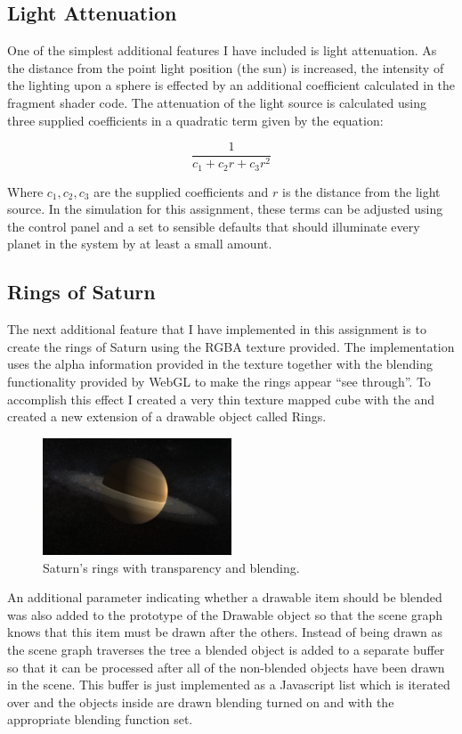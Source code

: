\documentclass[paper=a4, fontsize=11pt]{scrartcl}	%
\numberwithin{equation}{section}															%
\numberwithin{figure}{section}																%
\numberwithin{table}{section}																%
\begin{document}
\subsection{Light Attenuation}
One of the simplest additional features I have included is light attenuation. As the distance from the point light position (the sun) is increased, the intensity of the lighting upon a sphere is effected by an additional coefficient calculated in the fragment shader code.  The attenuation of the light source is calculated using three supplied coefficients in a  quadratic term given by the equation:

\begin{equation}
\frac{1}{c_1 + c_2r + c_3r^2}
\end{equation}

Where $c_1, c_2,c_3$ are the supplied coefficients and $r$ is the distance from the light source. In the simulation for this assignment, these terms can be adjusted using the control panel and a set to sensible defaults that should illuminate every planet in the system by at least a small amount.

\subsection{Rings of Saturn}
The next additional feature that I have implemented in this assignment is to create the rings of Saturn using the RGBA texture provided. The implementation uses the alpha information provided in the texture together with the blending functionality provided by WebGL to make the rings appear ``see through''. To accomplish this effect I created a very thin texture mapped cube with the and created a new extension of a drawable object called Rings. 

\begin{figure}[H]
\centering
\includegraphics[width=0.5\textwidth]{img/saturns_rings.png}
\caption{Saturn's rings with transparency and blending.}
\label{fig:saturns-rings}
\end{figure}

An additional parameter indicating whether a drawable item should be blended was also added to the prototype of the Drawable object so that the scene graph knows that this item must be drawn after the others. Instead of being drawn as the scene graph traverses the tree a blended object is added to a separate buffer so that it can be processed after all of the non-blended objects have been drawn in the scene. This buffer is just implemented as a Javascript list which is iterated over and the objects inside are drawn blending turned on and with the appropriate blending function set.
\end{document}
